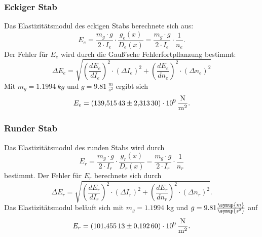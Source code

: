 \subsubsection{Eckiger Stab}
Das Elastizitätsmodul des eckigen Stabs berechnete sich aus:
\begin{equation}
  E_{e} = \frac{m_{g} \cdot g}{2 \cdot I_{e}} \cdot \frac{g_{e}(x)}{D_{e}(x)} = \frac{m_{g} \cdot g}{2 \cdot I_{e}} \cdot \frac{1}{n_{e}}.
  \label{eqn:eela}
\end{equation}
 Der Fehler für $E_{e}$ wird durch die Gauß'sche Fehlerfortpflanzung bestimmt:
\begin{equation}
    \Delta E_{e} = \sqrt{ \left(\frac{d E_{e}}{d I_{e}} \right)^2 \cdot \left(\Delta I_{e}\right)^2 + \left(\frac{d E_{e}}{d n_{e}}\right)^2 \cdot \left(\Delta n_{e}\right)^2}
    \label{eqn:gaußee}
\end{equation}
 Mit $m_{g}=\SI{1.1994}{kg}$ und $g=\SI{9.81}{\frac{m}{s^2}}$ ergibt sich
\begin{equation*}
  E_{e}= \SI{139.51543 \pm 2.31330e09}{\frac{N}{m^2}}.
\end{equation*}

\subsubsection{Runder Stab}
Das Elastizitätsmodul des runden Stabs wird durch
\begin{equation}
  E_{r} = \frac{m_{g} \cdot g}{2 \cdot I_{r}} \cdot \frac{g_{r}(x)}{D_{r}(x)} = \frac{m_{g} \cdot g}{2 \cdot I_{r}} \cdot \frac{1}{n_{r}}
  \label{eqn:rela}
\end{equation}
 bestimmt. Der Fehler für $E_{r}$ berechnete sich durch
\begin{equation}
    \Delta E_{r} = \sqrt{ \left(\frac{d E_{r}}{d I_{r}}\right)^2 \cdot \left(\Delta I_{r}\right)^2 + \left(\frac{d E_{r}}{d n_{r}}\right)^2 \cdot \left(\Delta n_{r}\right)^2}.
    \label{eqn:gaußer}
\end{equation}
 Das Elastizitätsmodul beläuft sich mit $m_{g}=1.1994$ kg und $g=9.81 \frac{\symup{m}}{\symup{s^2}}$ auf
\begin{equation*}
  E_{r}=\SI{101.45513 \pm 0.19260e09}{\frac{N}{m^2}}.
\end{equation*}

